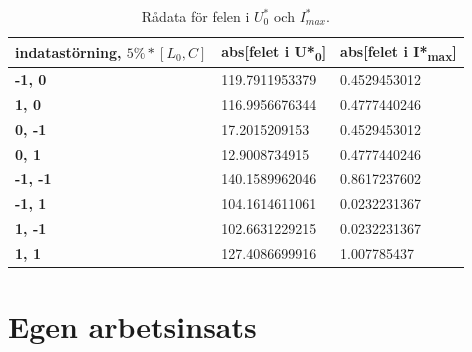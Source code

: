 \documentclass[a4paper, titlepage, 11pt]{article}
\begin{document}
\begin{table}[H]
\caption{Rådata för felen i $U_0^*$ och $I_{max}^*$.}
\begin{center}
\begin{tabular}{l|ll}
\hline
\textbf{indatastörning, $5\% * [L_0, C]$} & \textbf{abs{[}felet i U*\textsubscript{0}{]}}         & \textbf{abs{[}felet i I*\textsubscript{max}{]}}     \\ \hline
\textbf{-1, 0}          & {\color[HTML]{000000} 119.7911953379} & {\color[HTML]{000000} 0.4529453012} \\
\textbf{1, 0}           & {\color[HTML]{000000} 116.9956676344} & {\color[HTML]{000000} 0.4777440246} \\
\textbf{0, -1}          & {\color[HTML]{000000} 17.2015209153}  & {\color[HTML]{000000} 0.4529453012} \\
\textbf{0, 1}           & {\color[HTML]{000000} 12.9008734915}  & {\color[HTML]{000000} 0.4777440246} \\
\textbf{-1, -1}         & {\color[HTML]{000000} 140.1589962046} & {\color[HTML]{000000} 0.8617237602} \\
\textbf{-1, 1}          & {\color[HTML]{000000} 104.1614611061} & {\color[HTML]{000000} 0.0232231367} \\
\textbf{1, -1}          & {\color[HTML]{000000} 102.6631229215} & {\color[HTML]{000000} 0.0232231367} \\
\textbf{1, 1}           & {\color[HTML]{000000} 127.4086699916} & {\color[HTML]{000000} 1.007785437} 
\end{tabular}
\end{center}
\end{table}


\section{Egen arbetsinsats}
\end{document}
